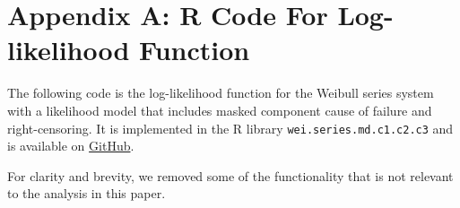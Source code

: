 \documentclass[
]{article}
\begin{document}
\hypertarget{appendix-a-r-code-for-log-likelihood-function}{%
\section*{Appendix A: R Code For Log-likelihood
Function}\label{appendix-a-r-code-for-log-likelihood-function}}

\label{app:loglike-code}

The following code is the log-likelihood function for the Weibull series
system with a likelihood model that includes masked component cause of
failure and right-censoring. It is implemented in the R library
\texttt{wei.series.md.c1.c2.c3} and is available on
\href{https://github.com/queelius/wei.series.md.c1.c2.c3}{GitHub}.

For clarity and brevity, we removed some of the functionality that is
not relevant to the analysis in this paper.
\end{document}
